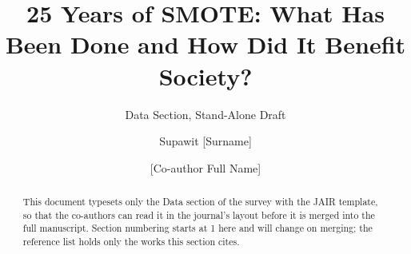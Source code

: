 \documentclass[manuscript, screen, review]{jair}
\begin{document}
\title[25 Years of SMOTE]{25 Years of SMOTE: What Has Been Done and How Did It Benefit Society?}
\subtitle{Data Section, Stand-Alone Draft}

\author{Supawit [Surname]}

\author{[Co-author Full Name]}

\renewcommand{\shortauthors}{[Surname] \& [Co-author Surname]}

\begin{abstract}
This document typesets only the Data section of the survey with the JAIR template, so that the
co-authors can read it in the journal's layout before it is merged into the full manuscript.
Section numbering starts at 1 here and will change on merging; the reference list holds only the
works this section cites.
\end{abstract}

\maketitle



\printbibliography
\end{document}
